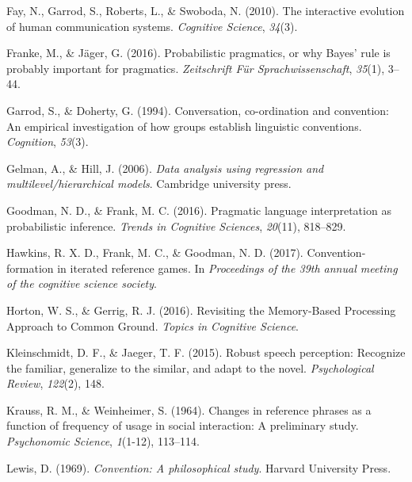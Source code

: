 \documentclass[10pt, letterpaper]{article}
\begin{document}
\leavevmode\hypertarget{ref-fay_interactive_2010}{}%
Fay, N., Garrod, S., Roberts, L., \& Swoboda, N. (2010). The interactive
evolution of human communication systems. \emph{Cognitive Science},
\emph{34}(3).

\leavevmode\hypertarget{ref-FrankeJager16_ProbabilisticPragmatics}{}%
Franke, M., \& Jäger, G. (2016). Probabilistic pragmatics, or why Bayes'
rule is probably important for pragmatics. \emph{Zeitschrift Für
Sprachwissenschaft}, \emph{35}(1), 3--44.

\leavevmode\hypertarget{ref-garrod_conversation_1994}{}%
Garrod, S., \& Doherty, G. (1994). Conversation, co-ordination and
convention: An empirical investigation of how groups establish
linguistic conventions. \emph{Cognition}, \emph{53}(3).

\leavevmode\hypertarget{ref-gelman2006data}{}%
Gelman, A., \& Hill, J. (2006). \emph{Data analysis using regression and
multilevel/hierarchical models}. Cambridge university press.

\leavevmode\hypertarget{ref-GoodmanFrank16_RSATiCS}{}%
Goodman, N. D., \& Frank, M. C. (2016). Pragmatic language
interpretation as probabilistic inference. \emph{Trends in Cognitive
Sciences}, \emph{20}(11), 818--829.

\leavevmode\hypertarget{ref-hawkins_convention-formation_2017}{}%
Hawkins, R. X. D., Frank, M. C., \& Goodman, N. D. (2017).
Convention-formation in iterated reference games. In \emph{Proceedings
of the 39th annual meeting of the cognitive science society}.

\leavevmode\hypertarget{ref-horton_revisiting_2016}{}%
Horton, W. S., \& Gerrig, R. J. (2016). Revisiting the Memory-Based
Processing Approach to Common Ground. \emph{Topics in Cognitive
Science}.

\leavevmode\hypertarget{ref-KleinschmidtJaeger15_RobustSpeechPerception}{}%
Kleinschmidt, D. F., \& Jaeger, T. F. (2015). Robust speech perception:
Recognize the familiar, generalize to the similar, and adapt to the
novel. \emph{Psychological Review}, \emph{122}(2), 148.

\leavevmode\hypertarget{ref-krauss_changes_1964}{}%
Krauss, R. M., \& Weinheimer, S. (1964). Changes in reference phrases as
a function of frequency of usage in social interaction: A preliminary
study. \emph{Psychonomic Science}, \emph{1}(1-12), 113--114.

\leavevmode\hypertarget{ref-lewis_convention:_1969}{}%
Lewis, D. (1969). \emph{Convention: A philosophical study}. Harvard
University Press.
\end{document}
